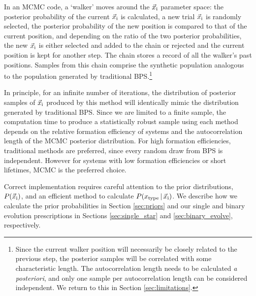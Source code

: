 \documentclass[usenatbib]{mnras}
\newcommand{\given}{\,|\,}
\newcommand{\Msun}{\ifmmode {M_{\odot}}\else${M_{\odot}}$\fi}
\newcommand{\sse}{{\tt SSE}}
\begin{document}
In an MCMC code, a `walker' moves around the $\vec{x}_{\rm i}$ parameter space: the posterior probability of the current $\vec{x}_{\rm i}$ is calculated, a new trial $\vec{x}_{\rm i}$ is randomly selected, the posterior probability of the new position is compared to that of the current position, and depending on the ratio of the two posterior probabilities, the new $\vec{x}_{\rm i}$ is either selected and added to the chain or rejected and the current position is kept for another step. The chain stores a record of all the walker's past positions. Samples from this chain comprise the synthetic population analogous to the population generated by traditional BPS.\footnote{Since the current walker position will necessarily be closely related to the previous step, the posterior samples will be correlated with some characteristic length. The autocorrelation length needs to be calculated {\it a posteriori}, and only one sample per autocorrelation length can be considered independent. We return to this in Section \ref{sec:limitations}.}


In principle, for an infinite number of iterations, the distribution of posterior samples of $\vec{x}_{\rm i}$ produced by this method will identically mimic the distribution generated by traditional BPS. Since we are limited to a finite sample, the computation time to produce a statistically robust sample using each method depends on the relative formation efficiency of systems and the autocorrelation length of the MCMC posterior distribution. For high formation efficiencies, traditional methods are preferred, since every random draw from BPS is independent. However for systems with low formation efficiencies or short lifetimes, MCMC is the preferred choice.


Correct implementation requires careful attention to the prior distributions, $P(\vec{x}_{\rm i})$, and an efficient method to calculate $P(x_{\rm type} \given \vec{x}_{\rm i})$. We describe how we calculate the prior probabilities in Section \ref{sec:priors} and our single and binary evolution prescriptions in Sections \ref{sec:single_star} and \ref{sec:binary_evolve}, respectively.







\end{document}

